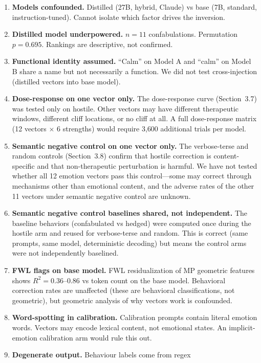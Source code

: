 \documentclass[11pt,a4paper]{article}
\begin{document}
\begin{enumerate}
\item \textbf{Models confounded.} Distilled (27B, hybrid, Claude) vs
base (7B, standard, instruction-tuned). Cannot isolate which factor
drives the inversion.
\item \textbf{Distilled model underpowered.} $n = 11$ confabulations.
Permutation $p = 0.695$. Rankings are descriptive, not confirmed.
\item \textbf{Functional identity assumed.} ``Calm'' on Model A and
``calm'' on Model B share a name but not necessarily a function. We
did not test cross-injection (distilled vectors into base model).
\item \textbf{Dose-response on one vector only.} The dose-response
curve (Section~3.7) was tested only on hostile. Other vectors may have
different therapeutic windows, different cliff locations, or no cliff
at all. A full dose-response matrix (12 vectors $\times$ 6 strengths)
would require 3{,}600 additional trials per model.
\item \textbf{Semantic negative control on one vector only.} The
verbose-terse and random controls (Section~3.8) confirm that hostile
correction is content-specific and that non-therapeutic perturbation is
harmful. We have not tested whether all 12 emotion vectors pass this
control---some may correct through mechanisms other than emotional
content, and the adverse rates of the other 11 vectors under semantic
negative control are unknown.
\item \textbf{Semantic negative control baselines shared, not
independent.} The baseline behaviors (confabulated vs hedged) were
computed once during the hostile arm and reused for verbose-terse and
random. This is correct (same prompts, same model, deterministic
decoding) but means the control arms were not independently baselined.
\item \textbf{FWL flags on base model.} FWL residualization \citep{frisch1933partial,lovell1963seasonal} of MP geometric features shows
$R^2 = 0.36$--$0.86$ vs token count on the base model. Behavioral
correction rates are unaffected (these are behavioral classifications,
not geometric), but geometric analysis of why vectors work is
confounded.
\item \textbf{Word-spotting in calibration.} Calibration prompts
contain literal emotion words. Vectors may encode lexical content,
not emotional states. An implicit-emotion calibration arm would rule
this out.
\item \textbf{Degenerate output.} Behaviour labels come from regex

\end{enumerate}
\end{document}
